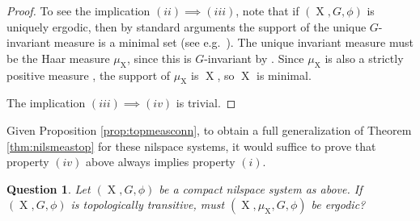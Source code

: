 \documentclass[a4paper,12pt,reqno]{amsart}
\newtheorem{question}[theorem]{Question}
\theoremstyle{definition}
\DeclareMathOperator{\ns}{X}
\begin{document}
\begin{proof}
To see the implication $(ii)\implies (iii)$, note that if $(\ns,G,\phi)$ is uniquely ergodic, then by standard arguments the support of the unique $G$-invariant measure is a minimal set (see e.g.\ \cite[Proposition 6.2.1]{O&V}). The unique invariant measure must be the Haar measure $\mu_{\ns}$, since this is $G$-invariant by \cite[Lemma 2.2.6]{Cand:Notes2}. Since $\mu_{\ns}$ is also a strictly positive measure \cite[Proposition 2.2.11]{Cand:Notes2}, the support of $\mu_{\ns}$ is $\ns$, so $\ns$ is minimal.

The implication $(iii)\implies (iv)$ is trivial. 
\end{proof}
\noindent Given Proposition \ref{prop:topmeasconn}, to obtain a full generalization of Theorem \ref{thm:nilsmeastop} for these nilspace systems, it would suffice to prove that property $(iv)$ above always implies property $(i)$.

\begin{question}
Let $(\ns,G,\phi)$ be a compact nilspace system as above. If $(\ns,G,\phi)$ is topologically transitive, must $(\ns,\mu_{\ns},G,\phi)$ be ergodic?
\end{question}
\end{document}
